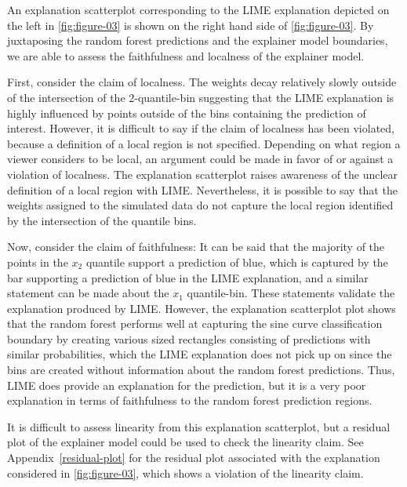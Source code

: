 \documentclass[AMS,STIX2COL]{WileyNJD-v2}\usepackage[]{graphicx}\usepackage[]{color}
\begin{document}
An explanation scatterplot corresponding to the LIME explanation depicted on the left in \autoref{fig:figure-03} is shown on the right hand side of \autoref{fig:figure-03}. By juxtaposing the random forest predictions and the explainer model boundaries, we are able to assess the faithfulness and localness of the explainer model. 

First, consider the claim of localness. The weights decay relatively slowly outside of the intersection of the 2-quantile-bin suggesting that the LIME explanation is highly influenced by points outside of the bins containing the prediction of interest. However, it is difficult to say if the claim of localness has been violated, because a definition of a local region is not specified. Depending on what region a viewer considers to be local, an argument could be made in favor of or against a violation of localness. The explanation scatterplot raises awareness of the unclear definition of a local region with LIME. Nevertheless, it is possible to say that the weights assigned to the simulated data do not capture  the local region identified by the intersection of the quantile bins.

Now, consider the claim of faithfulness: It can be said that the majority of the points in the $x_2$ quantile support a prediction of blue, which is captured by the bar supporting a prediction of blue in the LIME explanation, and a similar statement can be made about the $x_1$ quantile-bin. These statements validate the explanation produced by LIME. However, the explanation scatterplot plot shows that the random forest performs well at capturing the sine curve classification boundary by creating various sized rectangles consisting of predictions with similar probabilities, which the LIME explanation does not pick up on since the bins are created without information about the random forest predictions. Thus, LIME does provide an explanation for the prediction, but it is a very poor explanation in terms of faithfulness to the random forest prediction regions.

It is difficult to assess linearity from this explanation scatterplot, but a residual plot of the explainer model could be used to check the linearity claim. See Appendix~\ref{residual-plot} for the residual plot associated with the explanation considered in \autoref{fig:figure-03}, which shows a violation of the linearity claim.
\end{document}
